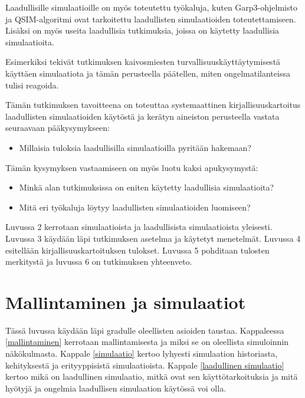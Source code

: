 \documentclass[utf8]{gradu3}
\begin{document}
Laadullisille simulaatioille on myös toteutettu työkaluja, kuten Garp3-ohjelmisto \parencite{bredeweg2007garp3} ja QSIM-algoritmi \parencite{helgstrand2004qsim} ovat tarkoitettu laadullisten simulaatioiden toteutettamiseen. Lisäksi on myös useita laadullisia tutkimuksia, joissa on käytetty laadullisia simulaatioita. 
\begin{comment}
Viekö esimerkki tekstiä aidosti eteenpäin.
\end{comment}Esimerkiksi \textcite{cao2019depth} tekivät tutkimuksen kaivosmiesten turvallisuuskäyttäytymisestä käyttäen simulaatiota ja tämän perusteella päätellen, miten ongelmatilanteissa tulisi reagoida. 

\begin{comment}
Tämäkin on sanoitettu menetelmä edellä kuten otsikko. Yleensä tavoitteet ja kysymykset muotoillaan ensin ja sitten valitaan menetelmä, jolla niihin voi vastata.
\end{comment}
Tämän tutkimuksen tavoitteena on toteuttaa systemaattinen kirjallisuuskartoitus laadullisten simulaatioiden käytöstä ja kerätyn aineiston perusteella vastata seuraavaan pääkysymykseen:
\begin{itemize}
    \item Millaisia tuloksia laadullisilla simulaatioilla pyritään hakemaan?
\end{itemize}

Tämän kysymyksen vastaamiseen on myös luotu kaksi apukysymystä:
\begin{itemize}
    \item Minkä alan tutkimuksissa on eniten käytetty laadullisia simulaatioita?
    \item Mitä eri työkaluja löytyy laadullisten simulaatioiden luomiseen?
\end{itemize}

Luvussa 2 kerrotaan simulaatioista ja laadullisista simulaatioista yleisesti. Luvussa 3 käydään läpi tutkimuksen asetelma ja käytetyt menetelmät. Luvussa 4 esitellään kirjallisuuskartoituksen tulokset. Luvussa 5 pohditaan tulosten merkitystä ja luvussa 6 on tutkimuksen yhteenveto.

\chapter{Mallintaminen ja simulaatiot}
Tässä luvussa käydään läpi gradulle oleellisten asioiden taustaa. 
Kappaleessa \ref{mallintaminen} kerrotaan mallintamisesta 
ja miksi se on oleellista simuloinnin näkökulmasta. 
Kappale \ref{simulaatio} kertoo lyhyesti simulaation historiasta, kehityksestä ja erityyppisistä simulaatioista. 
Kappale \ref{laadullinen simulaatio} kertoo mikä on laadullinen simulaatio, mitkä ovat sen käyttötarkoituksia ja mitä hyötyjä ja ongelmia laadullisen
simulaation käytössä voi olla.
\end{document}
